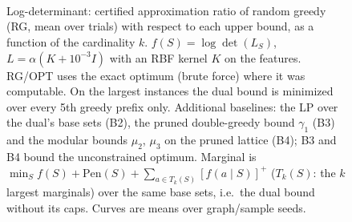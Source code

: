 \begin{figure}[t]
\centering
\setlength{\rgplotwidth}{0.49\columnwidth}
\\[1pt]
\hfill
\\
\hfill
\\

\caption{Log-determinant: certified approximation ratio of random greedy (RG, mean over trials) with respect to each upper bound, as a function of the cardinality $k$. $f(S)=\log\det(L_S)$, $L=\alpha(K+10^{-3}I)$ with an RBF kernel $K$ on the features. RG/OPT uses the exact optimum (brute force) where it was computable. On the largest instances the dual bound is minimized over every 5th greedy prefix only. Additional baselines: the LP over the dual's base sets (B2), the pruned double-greedy bound $\gamma_1$ (B3) and the modular bounds $\mu_2$, $\mu_3$ on the pruned lattice (B4); B3 and B4 bound the unconstrained optimum. Marginal is $\min_S f(S)+\mathrm{Pen}(S)+\sum_{a\in T_k(S)}[f(a\mid S)]^+$ ($T_k(S)$: the $k$ largest marginals) over the same base sets, i.e.\ the dual bound without its caps. Curves are means over graph/sample seeds.}
\label{fig:rg-log_det-baselines}
\end{figure}
